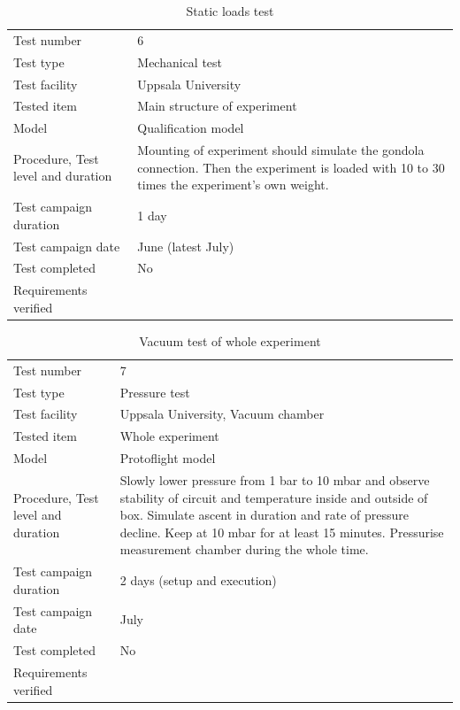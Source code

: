 \documentclass[
  a4paper,
  11pt,
  openany,
  parskip,
  toc=totoc,
  listof=totoc,
  bibliography=totoc
]{scrreprt}
\begin{document}
\begin{table}[H]
\centering
\caption{Static loads test}
\label{tab:test_static_loads}
\begin{tabular}{L{5cm}L{10cm}}
\toprule
Test number & 6 \\
Test type & Mechanical test \\
Test facility & Uppsala University \\
Tested item & Main structure of experiment \\
Model & Qualification model \\
Procedure, Test level and duration & Mounting of experiment should simulate the gondola connection. Then the experiment is loaded with 10 to 30 times the experiment's own weight. \\
Test campaign duration & 1 day \\
Test campaign date & June (latest July) \\
Test completed & No \\
Requirements verified & \\
\bottomrule
\end{tabular}
\end{table}



\begin{table}[H]
\centering
\caption{Vacuum test of whole experiment}
\label{tab:vacuum_test}
\begin{tabular}{L{5cm}L{10cm}}
\toprule
Test number & 7  \\
Test type & Pressure test \\
Test facility & Uppsala University, Vacuum chamber \\
Tested item & Whole experiment \\
Model & Protoflight model \\
Procedure, Test level and duration & Slowly lower pressure from 1 bar to 10 mbar and observe stability of circuit and temperature inside and outside of box. Simulate ascent in duration and rate of pressure decline. Keep at 10 mbar for at least 15 minutes. Pressurise measurement chamber during the whole time. \\
Test campaign duration & 2 days (setup and execution) \\
Test campaign date & July \\
Test completed & No \\
Requirements verified & \\
\bottomrule
\end{tabular}
\end{table}
\end{document}
